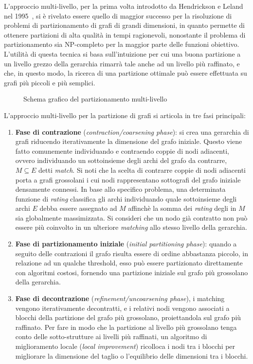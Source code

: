 L'approccio multi-livello, per la prima volta introdotto da Hendrickson e Leland nel
1995~\cite{Hendrickson1995}, si \`e rivelato essere quello di maggior successo per la risoluzione
di problemi di partizionamento di grafi di grandi dimensioni, in quanto permette di ottenere partizioni di alta
qualit\`a in tempi ragionevoli, nonostante il problema di partizionamento sia NP-completo per la maggior parte delle
funzioni obiettivo.
L'utilit\`a di questa tecnica si basa sull'intuizione per cui una buona partizione a un livello grezzo della
gerarchia rimarr\`a tale anche ad un livello pi\`u raffinato, e che, in questo modo, la ricerca di una
partizione ottimale pu\`o essere effettuata su grafi pi\`u piccoli e pi\`u semplici.
\newpage

\begin{figure}
    \centering
    
    \caption{Schema grafico del partizionamento multi-livello}
    \label{fig:multi-level-graph-partitioning}
\end{figure}

L'approccio multi-livello per la partizione di grafi si articola in tre fasi principali:
\begin{enumerate}
    \item \textbf{Fase di contrazione} (\textit{contraction/coarsening phase}):
    si crea una gerarchia di grafi riducendo iterativamente la dimensione del grafo iniziale.
    Questo viene fatto comunemente individuando e contraendo coppie di nodi adiacenti, ovvero individuando un
    sottoinsieme degli archi del grafo da contrarre, $M \subseteq E $ detti \textit{match}.
    Si noti che la scelta di contrarre coppie di nodi adiacenti porta a grafi grossolani i cui nodi rappresentano
    sottografi del grafo iniziale densamente connessi.
    In base allo specifico problema, una determinata funzione di \textit{rating} classifica gli archi individuando
    quale sottoinsieme degli archi $E$ debba essere assegnato ad $M$ affinch\`e la somma dei \textit{rating} degli in
    $M$ sia globalmente massimizzata.
    Si consideri che un nodo gi\`a contratto non pu\`o essere pi\`u coinvolto in un ulteriore \textit{matching}
    allo stesso livello della gerarchia.
    \item \textbf{Fase di partizionamento iniziale} (\textit{initial partitioning phase}): quando a seguito delle
    contrazioni il grafo risulta essere di ordine abbastanza piccolo, in relazione ad un qualche threshold,
    esso pu\`o essere partizionato direttamente con algoritmi costosi, fornendo una partizione iniziale sul grafo
    pi\`u grossolano della gerarchia.
    \item \textbf{Fase di decontrazione} (\textit{refinement/uncoarsening phase}), i matching vengono iterativamente
    decontratti, e i relativi nodi vengono associati a blocchi della partizione del grafo pi\`u grossolano,
    proiettandola sul grafo pi\`u raffinato.
    Per fare in modo che la partizione al livello pi\`u grossolano tenga conto delle sotto-strutture ai livelli
    pi\`u raffinati, un algoritmo di miglioramento locale (\textit{local improvement}) ricolloca i nodi tra i
    blocchi per migliorare la dimensione del taglio o l'equilibrio delle dimensioni tra i blocchi.
\end{enumerate}